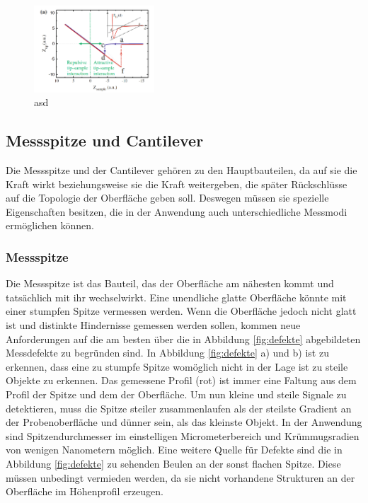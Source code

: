           \FloatBarrier

          \begin{figure}[h]
            \centering
            \includegraphics[width = 0.4\textwidth]{pictures/forcedist.png}
            \caption{asd}
            \label{fig:forcedist}
          \end{figure}
        
          \FloatBarrier






      \newpage


      \subsection{Messspitze und Cantilever}
        Die Messspitze und der Cantilever gehören zu den Hauptbauteilen, da auf sie die Kraft wirkt beziehungsweise sie die Kraft weitergeben, die später Rückschlüsse auf die Topologie der Oberfläche geben soll.
        Deswegen müssen sie spezielle Eigenschaften besitzen, die in der Anwendung auch unterschiedliche Messmodi ermöglichen können.

        \subsubsection*{Messspitze}
          Die Messspitze ist das Bauteil, das der Oberfläche am nähesten kommt und tatsächlich mit ihr wechselwirkt. Eine unendliche glatte Oberfläche könnte mit einer stumpfen Spitze vermessen werden. Wenn
          die Oberfläche jedoch nicht glatt ist und distinkte Hindernisse gemessen werden sollen, kommen neue Anforderungen auf die am besten über die in Abbildung \ref{fig:defekte} abgebildeten Messdefekte
          zu begründen sind. In Abbildung \ref{fig:defekte} a) und b) ist zu erkennen, dass eine zu stumpfe Spitze womöglich nicht in der Lage ist zu steile Objekte zu erkennen. Das gemessene Profil (rot) ist
          immer eine Faltung aus dem Profil der Spitze und dem der Oberfläche. Um nun kleine und steile Signale zu detektieren, muss die Spitze steiler zusammenlaufen als der steilste Gradient an der 
          Probenoberfläche und dünner sein, als das kleinste Objekt. In der Anwendung sind Spitzendurchmesser im einstelligen Micrometerbereich und Krümmugsradien von wenigen Nanometern möglich. Eine weitere
          Quelle für Defekte sind die in Abbildung \ref{fig:defekte} zu sehenden Beulen an der sonst flachen Spitze. Diese müssen unbedingt vermieden werden, da sie nicht vorhandene Strukturen an der Oberfläche
          im Höhenprofil erzeugen. 
        
